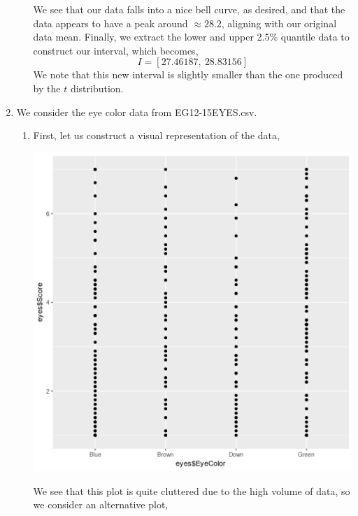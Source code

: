 \documentclass[letterpaper,10pt]{article}
\begin{document}
\begin{enumerate}
\begin{enumerate}
\begin{center}
\end{center}
We see that our data falls into a nice bell curve, as desired, and that the data appears to have a peak around $\approx 28.2$, aligning with our original data mean. Finally, we extract the lower and upper 2.5\% quantile data to construct our interval, which becomes,
\[I=\left[27.46187,\ 28.83156\right]\]
We note that this new interval is slightly smaller than the one produced by the $t$ distribution. 
\end{enumerate}
\item We consider the eye color data from EG12-15EYES.csv.
\begin{enumerate}
\item First, let us construct a visual representation of the data,
\begin{center}
\includegraphics[scale=.6]{2qplot.png}
\end{center}
We see that this plot is quite cluttered due to the high volume of data, so we consider an alternative plot,
\begin{center}

\end{center}
\end{enumerate}
\end{enumerate}
\end{document}
